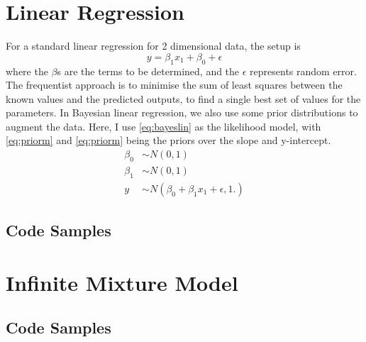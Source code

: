 \section{Linear Regression} \label{app:linreg}
For a standard linear regression for 2 dimensional data, the setup is 
\[y=\beta_1 x_1 + \beta_0 + \epsilon \]
where the $\beta$s are the terms to be determined, and the $\epsilon$ represents random error. The frequentist approach is to minimise the sum of least squares between the known values and the predicted outputs, to find a single best set of values for the parameters. In Bayesian linear regression, we also use some prior distributions to augment the data. Here, I use \eqref{eq:bayeslin} as the likelihood model, with \eqref{eq:priorm} and \eqref{eq:priorm} being the priors over the slope and y-intercept.
\begin{align}
	\beta_0 & \sim N(0,1)\label{eq:priorm}                                    \\
	\beta_1 & \sim N(0,1)\label{eq:priorc}                                    \\
	y       & \sim N(\beta_0 + \beta_1 x_1 + \epsilon, 1.)\label{eq:bayeslin} 
\end{align}

\FloatBarrier
\subsection{Code Samples}
\begin{figure}[!ht]
	\begin{minipage}{0.5\linewidth}
	\end{minipage}
	\begin{minipage}{0.5\linewidth}
	\end{minipage}
\end{figure}
\FloatBarrier

\section{Infinite Mixture Model} \label{app:dp}

\subsection{Code Samples}

\begin{listing}
\end{listing}

\begin{listing}
\end{listing}

\begin{listing}
\end{listing}
